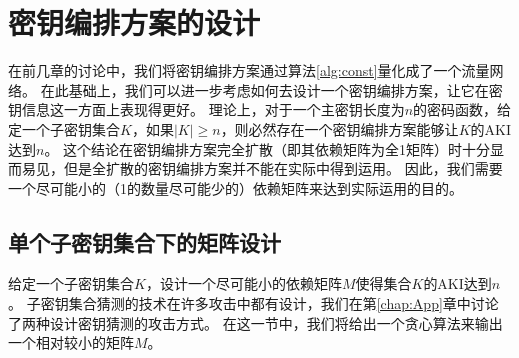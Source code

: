 
\chapter{密钥编排方案的设计}
\label{chap:Design}
在前几章的讨论中，我们将密钥编排方案通过算法\ref{alg:const}量化成了一个流量网络。
在此基础上，我们可以进一步考虑如何去设计一个密钥编排方案，让它在密钥信息这一方面上表现得更好。
理论上，对于一个主密钥长度为$n$的密码函数，给定一个子密钥集合$K$，如果$|K|\geq n$，则必然存在一个密钥编排方案能够让$K$的AKI达到$n$。
这个结论在密钥编排方案完全扩散（即其依赖矩阵为全1矩阵）时十分显而易见，但是全扩散的密钥编排方案并不能在实际中得到运用。
因此，我们需要一个尽可能小的（1的数量尽可能少的）依赖矩阵来达到实际运用的目的。

\section{单个子密钥集合下的矩阵设计}
给定一个子密钥集合$K$，设计一个尽可能小的依赖矩阵$M$使得集合$K$的AKI达到$n$。
子密钥集合猜测的技术在许多攻击中都有设计，我们在第\ref{chap:App}章中讨论了两种设计密钥猜测的攻击方式。
在这一节中，我们将给出一个贪心算法来输出一个相对较小的矩阵$M$。


